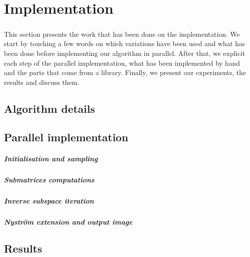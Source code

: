 \chapter{Implementation}

\paragraph{}
This section presents the work that has been done on the implementation.
We start by touching a few words on which variations have been used and what has been done before implementing our algorithm in parallel.
After that, we explicit each step of the parallel implementation, what has been implemented by hand and the parts that come from a library.
Finally, we present our experiments, the results and discuss them.

\section{Algorithm details}


\section{Parallel implementation}


\paragraph{Initialisation and sampling}


\paragraph{Submatrices computations}


\paragraph{Inverse subspace iteration}


\paragraph{Nystr\"om extension and output image}


\section{Results}

